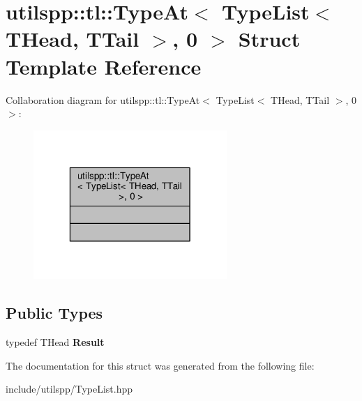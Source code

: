 \hypertarget{structutilspp_1_1tl_1_1TypeAt_3_01TypeList_3_01THead_00_01TTail_01_4_00_010_01_4}{\section{utilspp\-:\-:tl\-:\-:Type\-At$<$ Type\-List$<$ T\-Head, T\-Tail $>$, 0 $>$ Struct Template Reference}
\label{structutilspp_1_1tl_1_1TypeAt_3_01TypeList_3_01THead_00_01TTail_01_4_00_010_01_4}
}


Collaboration diagram for utilspp\-:\-:tl\-:\-:Type\-At$<$ Type\-List$<$ T\-Head, T\-Tail $>$, 0 $>$\-:
\nopagebreak
\begin{figure}[H]
\begin{center}
\leavevmode
\includegraphics[width=208pt]{structutilspp_1_1tl_1_1TypeAt_3_01TypeList_3_01THead_00_01TTail_01_4_00_010_01_4__coll__graph}
\end{center}
\end{figure}
\subsection*{Public Types}
\begin{DoxyCompactItemize}
\item 
\hypertarget{structutilspp_1_1tl_1_1TypeAt_3_01TypeList_3_01THead_00_01TTail_01_4_00_010_01_4_a21b25878f4dc0221c59aba804ecfabff}{typedef T\-Head {\bfseries Result}}\label{structutilspp_1_1tl_1_1TypeAt_3_01TypeList_3_01THead_00_01TTail_01_4_00_010_01_4_a21b25878f4dc0221c59aba804ecfabff}

\end{DoxyCompactItemize}


The documentation for this struct was generated from the following file\-:\begin{DoxyCompactItemize}
\item 
include/utilspp/Type\-List.\-hpp\end{DoxyCompactItemize}
